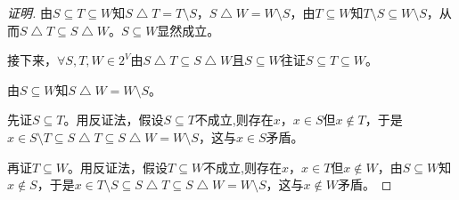 \documentclass{article}
\begin{document}
\begin{CJK}{UTF8}{gbsn}
\begin{proof}[证明]
  由$S \subseteq T \subseteq W$知$S \bigtriangleup T = T\setminus S$，$S \bigtriangleup W = W\setminus S$，由$T\subseteq W$知$T\setminus S \subseteq W\setminus S$，从而$S \bigtriangleup T \subseteq S \bigtriangleup W$。$S \subseteq W$显然成立。

  接下来，$\forall S,T,W \in 2^V$由$S \bigtriangleup T \subseteq S \bigtriangleup W$且$S \subseteq W$往证$S \subseteq T \subseteq W$。

  由$S\subseteq W$知$S\bigtriangleup W = W\setminus S$。
  
  先证$S\subseteq T$。用反证法，假设$S\subseteq T$不成立,则存在$x$，$x\in S$但$x \notin T$，于是$x\in S\setminus T\subseteq S\bigtriangleup T \subseteq S\bigtriangleup W = W\setminus S$，这与$x\in S$矛盾。

  再证$T\subseteq W$。用反证法，假设$T\subseteq W$不成立,则存在$x$，$x\in T$但$x \notin W$，由$S\subseteq W$知$x\notin S$，于是$x \in T\setminus S \subseteq S\bigtriangleup T \subseteq S\bigtriangleup W = W\setminus S$，这与$x\notin W$矛盾。
\end{proof}


\end{CJK}
\end{document}
